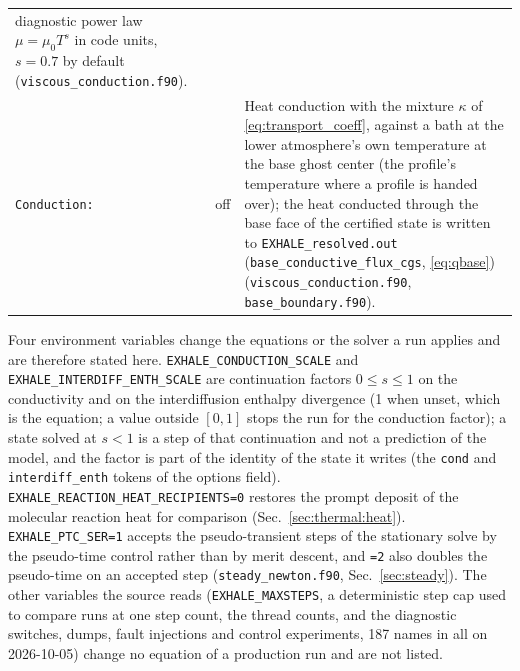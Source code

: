{\begin{longtable}{@{}>{\raggedright\arraybackslash}p{}>{\raggedright\arraybackslash}p{}>{\raggedright\arraybackslash}p{}@{}}
  diagnostic power law $\mu = \mu_0T^{s}$ in code units, $s = 0.7$ by default
  (\texttt{viscous\_conduction.f90}). \\
\texttt{Conduction:} & off &
  Heat conduction with the mixture $\kappa$ of \eqref{eq:transport_coeff},
  against a bath at the lower atmosphere's own temperature at the base ghost
  center (the profile's temperature where a profile is handed over); the heat
  conducted through the base face of the certified state is written to
  \texttt{EXHALE\_resolved.out} (\texttt{base\_conductive\_flux\_cgs},
  \eqref{eq:qbase})
  (\texttt{viscous\_conduction.f90}, \texttt{base\_boundary.f90}). \\
\end{longtable}
}

Four environment variables change the equations or the solver a run applies
and are therefore stated here.
\texttt{EXHALE\_CONDUCTION\_SCALE} and \texttt{EXHALE\_INTERDIFF\_ENTH\_SCALE}
are continuation factors $0\le s\le1$ on the conductivity and on the
interdiffusion enthalpy divergence (1 when unset, which is the equation; a
value outside $[0,1]$ stops the run for the conduction factor); a
state solved at $s<1$ is a step of that continuation and not a prediction of
the model, and the factor is part of the identity of the state it writes (the
\texttt{cond} and \texttt{interdiff\_enth} tokens of the options field).
\texttt{EXHALE\_REACTION\_HEAT\_RECIPIENTS=0} restores the prompt deposit of
the molecular reaction heat for comparison (Sec.~\ref{sec:thermal:heat}).
\texttt{EXHALE\_PTC\_SER=1} accepts the pseudo-transient steps of the
stationary solve by the pseudo-time control rather than by merit descent, and
\texttt{=2} also doubles the pseudo-time on an accepted step
(\texttt{steady\_newton.f90}, Sec.~\ref{sec:steady}).  The other variables the
source reads (\texttt{EXHALE\_MAXSTEPS}, a deterministic step cap used to
compare runs at one step count, the thread counts, and the diagnostic
switches, dumps, fault injections and control experiments, 187 names in all
on 2026-10-05) change no equation of a production run and are not
listed.

